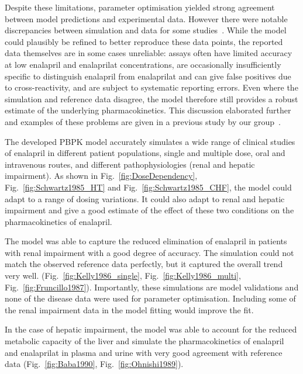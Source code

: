 \documentclass[pharmaceutics,article,submit,pdftex,moreauthors]{Definitions/mdpi}
\begin{document}
Despite these limitations, parameter optimisation yielded strong agreement between model predictions and experimental data. However there were notable discrepancies between simulation and data for some studies~\cite{Dickstein1987, Hockings1986}. While the model could plausibly be refined to better reproduce these data points, the reported data themselves are in some cases unreliable: assays often have limited accuracy at low enalapril and enalaprilat concentrations, are occasionally insufficiently specific to distinguish enalapril from enalaprilat and can give false positives due to cross-reactivity, and are subject to systematic reporting errors. Even where the simulation and reference data disagree, the model therefore still provides a robust estimate of the underlying pharmacokinetics. This discussion elaborated further and examples of these problems are given in a previous study by our group~\cite{Grzegorzewski2021a}.

The developed PBPK model accurately simulates a wide range of clinical studies of enalapril in different patient populations, single and multiple dose, oral and intravenous routes, and different pathophysiologies (renal and hepatic impairment). As shown in Fig.~\ref{fig:DoseDependency}, Fig.~\ref{fig:Schwartz1985_HT} and Fig.~\ref{fig:Schwartz1985_CHF}, the model could adapt to a range of dosing variations. It could also adapt to renal and hepatic impairment and give a good estimate of the effect of these two conditions on the pharmacokinetics of enalapril. 

The model was able to capture the reduced elimination of enalapril in patients with renal impairment with a good degree of accuracy. The simulation could not match the observed reference data perfectly, but it captured the overall trend very well. (Fig.~\ref{fig:Kelly1986_single}, Fig.~\ref{fig:Kelly1986_multi}, Fig.~\ref{fig:Fruncillo1987}). Importantly, these simulations are model validations and none of the disease data were used for parameter optimisation. Including some of the renal impairment data in the model fitting would improve the fit.

In the case of hepatic impairment, the model was able to account for the reduced metabolic capacity of the liver and simulate the pharmacokinetics of enalapril and enalaprilat in plasma and urine with very good agreement with reference data (Fig.~\ref{fig:Baba1990}, Fig.~\ref{fig:Ohnishi1989}).
\end{document}
